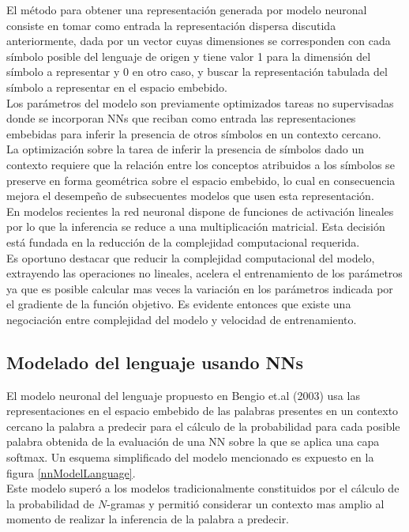 \documentclass{article}
\begin{document}
	El método para obtener una representación generada por modelo neuronal consiste en tomar como entrada la representación dispersa discutida anteriormente, dada por un vector cuyas dimensiones se corresponden con cada símbolo posible del lenguaje de origen y tiene valor 1 para la dimensión del símbolo a representar y 0 en otro caso, y buscar la representación tabulada del símbolo a representar en el espacio embebido.\\
	Los parámetros del modelo son previamente optimizados tareas no supervisadas donde se incorporan NNs que reciban como entrada las representaciones embebidas para inferir la presencia de otros símbolos en un contexto cercano. \\
	La optimización sobre la tarea de inferir la presencia de símbolos dado un contexto requiere que la relación entre los conceptos atribuidos a los símbolos se preserve en forma geométrica sobre el espacio embebido, lo cual en consecuencia mejora el desempeño de subsecuentes modelos que usen esta representación\cite{40CollobetWeston}.\\
	
	En modelos recientes la red neuronal dispone de funciones de activación lineales por lo que la inferencia se reduce a una multiplicación matricial. Esta decisión está fundada en la reducción de la complejidad computacional requerida.\\
	Es oportuno destacar que reducir la complejidad computacional del modelo, extrayendo las operaciones no lineales, acelera el entrenamiento de los parámetros ya que es posible calcular mas veces la variación en los parámetros indicada por el gradiente de la función objetivo. Es evidente entonces que existe una negociación entre complejidad del modelo y velocidad de entrenamiento.\\
	
	\subsection{Modelado del lenguaje usando NNs}
	El modelo neuronal del lenguaje propuesto en Bengio et.al (2003)\cite{37BengioNeuralEmbedding} usa las representaciones en el espacio embebido de las palabras presentes en un contexto cercano la palabra a predecir para el cálculo de la probabilidad para cada posible palabra obtenida de la evaluación de una NN sobre la que se aplica una capa softmax. Un esquema simplificado del modelo mencionado es expuesto en la figura \ref{nnModelLanguage}.\\
	Este modelo superó a los modelos tradicionalmente constituidos por el cálculo de la probabilidad de $N$-gramas y permitió considerar un contexto mas amplio al momento de realizar la inferencia de la palabra a predecir.\\
	
\end{document}
